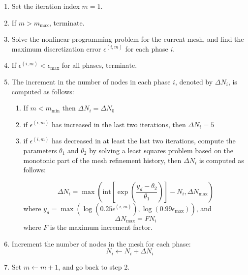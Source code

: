 \documentclass[a4paper,11pt]{report}    %
\begin{document}
\begin{enumerate}
 \item Set the iteration index $m=1$. 
 \item If $m>m_{\max}$, terminate.
 \item Solve the nonlinear programming problem for the current mesh, and find the maximum discretization error
$\epsilon^{(i,m)}$ for each phase $i$. 
 \item If $\epsilon^{(i,m)}< \epsilon_{\max}$ for all phases, terminate.
\item The increment in the number of nodes in each phase $i$, denoted by $\Delta N_i$, is computed as follows:
   \begin{enumerate} \item  If $m< m_{\min}$ then $\Delta N_i = \Delta N_0 $
                      \item if $\epsilon^{(i,m)}$ has increased in the last two iterations, then $\Delta N_i = 5$
                      \item if $\epsilon^{(i,m)}$ has decreased in at least the last two iterations, compute the parameters $\theta_1$ and $\theta_2$ by
solving a least squares problem based on the monotonic part of the mesh refinement history, then $\Delta N_i$ is computed as follows:

                    
                       \[
                          \Delta N_i = \max \left( \mathrm{int}\left[ \exp\left(\frac{y_d-\theta_2}{\theta_1}\right) \right]-N_i, \Delta N_{\max} \right)
                       \]
where $y_d = \max( \log(0.25 \epsilon^{(i,m)} ), \log( 0.99 \epsilon_{\max} ) )$, and
\[
  \Delta N_{\max} = F N_i
\]
where $F$ is the maximum increment factor.
   \end{enumerate}
\item Increment the number of nodes in the mesh for each phase: 
\[
   N_i \leftarrow N_i + \Delta N_i
\]
\item  Set $m\leftarrow m+1$, and go back to step 2.





\end{enumerate}
\end{document}
